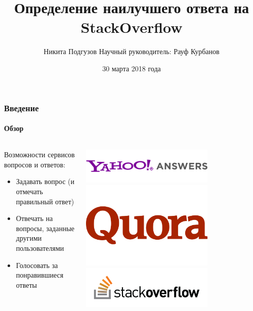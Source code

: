 \documentclass[10pt]{beamer}
\title[Определение наилучшего ответа на SO]{Определение наилучшего ответа на StackOverflow}
\author[Никита Подгузов]{
Никита Подгузов 
\texorpdfstring{\vskip0.5cm \footnotesize{Научный руководитель: Рауф Курбанов}}{}
}
\institute[СПбАУ]{Санкт-Петербургский Академический университет}
\date{30 марта 2018 года}
\begin{document}

\begin{frame}
\titlepage
\end{frame}


\begin{frame}
\frametitle{Введение}
\framesubtitle{Обзор}

\begin{columns}
    \begin{column}{0.6\textwidth}
        Возможности сервисов вопросов и ответов:
        \begin{itemize}
            \item Задавать вопрос (и отмечать правильный ответ) 
            \item Отвечать на вопросы, заданные другими пользователями
            \item Голосовать за понравившиеся ответы
        \end{itemize}
    \end{column}
    \begin{column}{0.4\textwidth}
        \begin{center}
            \includegraphics[width=0.7\textwidth]{images/yahoo_answers_logo.png} \\
            \includegraphics[width=0.7\textwidth]{images/quora_logo.png} \\
            \includegraphics[width=0.7\textwidth]{images/stackoverflow_logo.png}
        \end{center}
    \end{column}
\end{columns}
\end{frame}
\end{document}
